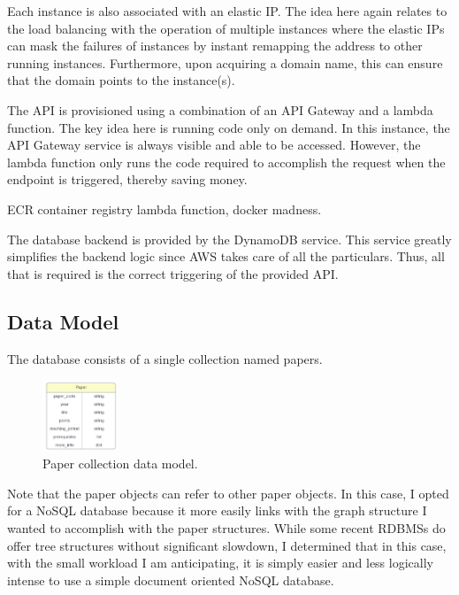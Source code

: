 \documentclass[12pt]{article}
\begin{document}
Each instance is also associated with an elastic IP. The idea here again relates to the load balancing with the operation of multiple instances where the elastic IPs can mask the failures of instances by instant remapping the address to other running instances. Furthermore, upon acquiring a domain name, this can ensure that the domain points to the instance(s).

The API is provisioned using a combination of an API Gateway and a lambda function. The key idea here is running code only on demand. In this instance, the API Gateway service is always visible and able to be accessed. However, the lambda function only runs the code required to accomplish the request when the endpoint is triggered, thereby saving money.   

ECR container registry lambda function, docker madness.

The database backend is provided by the DynamoDB service. This service greatly simplifies the backend logic since AWS takes care of all the particulars. Thus, all that is required is the correct triggering of the provided API. 

\subsection{Data Model}
The database consists of a single collection named papers.

\begin{figure}
    \caption{Paper collection data model.}
    \label{fig: paper_data_model}
    \begin{center}
        \includegraphics[width=0.2\textwidth]{../docs-assets/paper_erd.PNG}
    \end{center}
\end{figure}

Note that the paper objects can refer to other paper objects. In this case, I opted for a NoSQL database because it more easily links with the graph structure I wanted to accomplish with the paper structures. While some recent RDBMSs do offer tree structures without significant slowdown, I determined that in this case, with the small workload I am anticipating, it is simply easier and less logically intense to use a simple document oriented NoSQL database.
\end{document}

